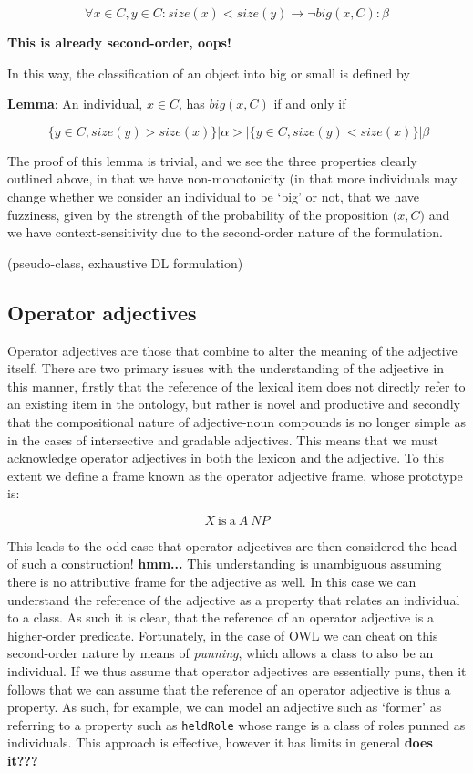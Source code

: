 \documentclass[11pt]{article}
\begin{document}
$$\forall x \in C, y \in C : size(x) < size(y) \rightarrow \neg big(x,C) : \beta$$

\textbf{This is already second-order, oops!}

In this way, the classification of an object into big or small is defined by

\noident\textbf{Lemma}: An individual, $x \in C$, has $big(x,C)$ if and only if 

$$|\{y \in C, size(y) > size(x)\}| \alpha > |\{y \in C, size(y) < size(x)\}| \beta$$

The proof of this lemma is trivial, and we see the three properties clearly outlined above, in that we have non-monotonicity (in that more individuals may change whether we consider an individual to be `big' or not, that we have fuzziness, given by the strength of the probability of the proposition $\big(x,C)$ and we have context-sensitivity due to the second-order nature of the formulation.

(pseudo-class, exhaustive DL formulation)

\subsection{Operator adjectives}

Operator adjectives are those that combine to alter the meaning of the adjective itself. There are two primary issues with the understanding of the adjective in this manner, firstly that the reference of the lexical item does not directly refer to an existing item in the ontology, but rather is novel and productive and secondly that the compositional nature of adjective-noun compounds is no longer simple as in the cases of intersective and gradable adjectives. This means that we must acknowledge operator adjectives in both the lexicon and the adjective. To this extent we define a frame known as the operator adjective frame, whose prototype is:

$$X\mathrm{~is~a~}A~NP$$

This leads to the odd case that operator adjectives are then considered the head of such a construction! \textbf{hmm...} This understanding is unambiguous assuming there is no attributive frame for the adjective as well. In this case we can understand the reference of the adjective as a property that relates an individual to a class. As such it is clear, that the reference of an operator adjective is a higher-order predicate. Fortunately, in the case of OWL we can cheat on this second-order nature by means of \emph{punning}, which allows a class to also be an individual. If we thus assume that operator adjectives are essentially puns, then it follows that we can assume that the reference of an operator adjective is thus a property. As such, for example, we can model an adjective such as `former' as referring to a property such as {\tt heldRole} whose range is a class of roles punned as individuals. This approach is effective, however it has limits in general \textbf{does it???}
\end{document}
